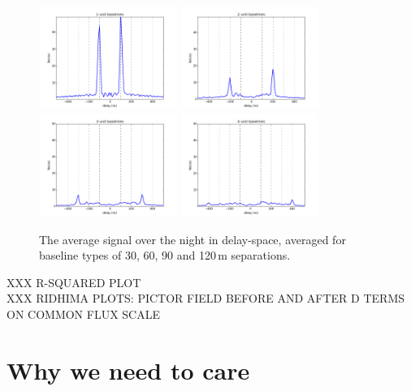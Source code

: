 \documentclass[10pt,a4paper,notitlepage]{article}
\begin{document}
\begin{figure}
\centering
\includegraphics[width=0.4\textwidth]{xx_1unit_xtalk_d.png}
\includegraphics[width=0.4\textwidth]{xx_2unit_xtalk_d.png}
\includegraphics[width=0.4\textwidth]{xx_3unit_xtalk_d.png}
\includegraphics[width=0.4\textwidth]{xx_4unit_xtalk_d.png}
\caption{The average signal over the night in delay-space, averaged for baseline types of 30, 60, 90 and 120\,m separations.}
\label{fig:the-money-plot}
\end{figure}

XXX R-SQUARED PLOT\\
XXX RIDHIMA PLOTS: PICTOR FIELD BEFORE AND AFTER D TERMS ON COMMON FLUX SCALE\\

\section{Why we need to care}
\end{document}
